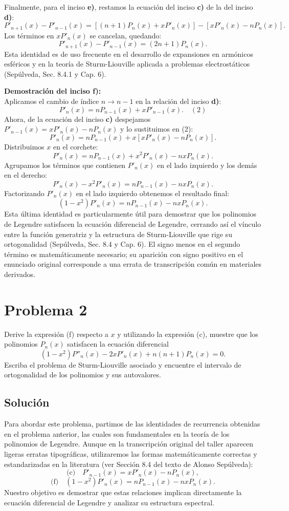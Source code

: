 \documentclass[a4paper]{article}
\begin{document}
Finalmente, para el inciso \textbf{e)}, restamos la ecuación del inciso \textbf{c)} de la del inciso \textbf{d)}:
$$
P'_{n+1}(x) - P'_{n-1}(x) = \left[ (n+1)P_n(x) + x P'_n(x) \right] - \left[ x P'_n(x) - n P_n(x) \right].
$$
Los términos en $x P'_n(x)$ se cancelan, quedando:
$$
P'_{n+1}(x) - P'_{n-1}(x) = (2n+1)P_n(x).
$$
Esta identidad es de uso frecuente en el desarrollo de expansiones en armónicos esféricos y en la teoría de Sturm-Liouville aplicada a problemas electrostáticos (Sepúlveda, Sec. 8.4.1 y Cap. 6).

\vspace{0.3cm}
\noindent\textbf{Demostración del inciso f):} \\
Aplicamos el cambio de índice $n \to n-1$ en la relación del inciso \textbf{d)}:
$$
P'_n(x) = n P_{n-1}(x) + x P'_{n-1}(x). \quad (2)
$$
Ahora, de la ecuación del inciso \textbf{c)} despejamos $P'_{n-1}(x) = x P'_n(x) - n P_n(x)$ y lo sustituimos en (2):
$$
P'_n(x) = n P_{n-1}(x) + x \left[ x P'_n(x) - n P_n(x) \right].
$$
Distribuimos $x$ en el corchete:
$$
P'_n(x) = n P_{n-1}(x) + x^2 P'_n(x) - n x P_n(x).
$$
Agrupamos los términos que contienen $P'_n(x)$ en el lado izquierdo y los demás en el derecho:
$$
P'_n(x) - x^2 P'_n(x) = n P_{n-1}(x) - n x P_n(x).
$$
Factorizando $P'_n(x)$ en el lado izquierdo obtenemos el resultado final:
$$
(1 - x^2) P'_n(x) = n P_{n-1}(x) - n x P_n(x).
$$
Esta última identidad es particularmente útil para demostrar que los polinomios de Legendre satisfacen la ecuación diferencial de Legendre, cerrando así el vínculo entre la función generatriz y la estructura de Sturm-Liouville que rige su ortogonalidad (Sepúlveda, Sec. 8.4 y Cap. 6). El signo menos en el segundo término es matemáticamente necesario; su aparición con signo positivo en el enunciado original corresponde a una errata de transcripción común en materiales derivados.


\section{Problema 2}
Derive la expresión (f) respecto a $x$ y utilizando la expresión (c), muestre que los polinomios $P_n(x)$ satisfacen la ecuación diferencial
$$
(1 - x^2)P''_n(x) - 2x P'_n(x) + n(n+1)P_n(x) = 0.
$$
Escriba el problema de Sturm-Liouville asociado y encuentre el intervalo de ortogonalidad de los polinomios y sus autovalores.

\subsection{Solución}
Para abordar este problema, partimos de las identidades de recurrencia obtenidas en el problema anterior, las cuales son fundamentales en la teoría de los polinomios de Legendre. Aunque en la transcripción original del taller aparecen ligeras erratas tipográficas, utilizaremos las formas matemáticamente correctas y estandarizadas en la literatura (ver Sección 8.4 del texto de Alonso Sepúlveda):
$$
\text{(c)} \quad P'_{n-1}(x) = x P'_n(x) - n P_n(x),
$$
$$
\text{(f)} \quad (1 - x^2)P'_n(x) = n P_{n-1}(x) - n x P_n(x).
$$
Nuestro objetivo es demostrar que estas relaciones implican directamente la ecuación diferencial de Legendre y analizar su estructura espectral.
\end{document}
